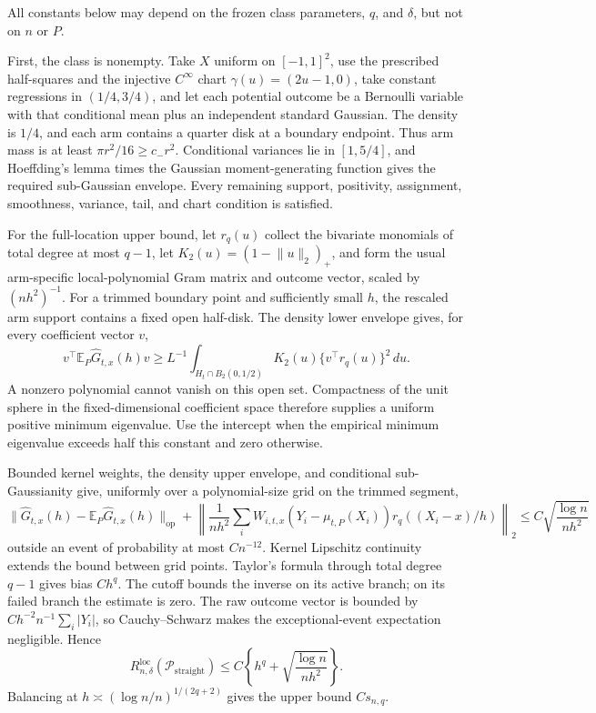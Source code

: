 All constants below may depend on the frozen class parameters, \(q\), and \(\delta\), but not on \(n\) or \(P\).

First, the class is nonempty.  Take \(X\) uniform on \([-1,1]^2\), use the prescribed half-squares and the injective \(C^\infty\) chart \(\gamma(u)=(2u-1,0)\), take constant regressions in \((1/4,3/4)\), and let each potential outcome be a Bernoulli variable with that conditional mean plus an independent standard Gaussian.  The density is \(1/4\), and each arm contains a quarter disk at a boundary endpoint.  Thus arm mass is at least \(\pi r^2/16\geq c_-r^2\).  Conditional variances lie in \([1,5/4]\), and Hoeffding's lemma times the Gaussian moment-generating function gives the required sub-Gaussian envelope.  Every remaining support, positivity, assignment, smoothness, variance, tail, and chart condition is satisfied.

For the full-location upper bound, let \(r_q(u)\) collect the bivariate monomials of total degree at most \(q-1\), let \(K_2(u)=(1-\lVert u\rVert_2)_+\), and form the usual arm-specific local-polynomial Gram matrix and outcome vector, scaled by \((nh^2)^{-1}\).  For a trimmed boundary point and sufficiently small \(h\), the rescaled arm support contains a fixed open half-disk.  The density lower envelope gives, for every coefficient vector \(v\),
\[
v^\top\mathbb E_P\widehat G_{t,x}(h)v
\geq L^{-1}\int_{H_t\cap B_2(0,1/2)}K_2(u)\{v^\top r_q(u)\}^2\,du.
\]
A nonzero polynomial cannot vanish on this open set.  Compactness of the unit sphere in the fixed-dimensional coefficient space therefore supplies a uniform positive minimum eigenvalue.  Use the intercept when the empirical minimum eigenvalue exceeds half this constant and zero otherwise.

Bounded kernel weights, the density upper envelope, and conditional sub-Gaussianity give, uniformly over a polynomial-size grid on the trimmed segment,
\[
\lVert\widehat G_{t,x}(h)-\mathbb E_P\widehat G_{t,x}(h)\rVert_{\mathrm{op}}
+\left\lVert\frac1{nh^2}\sum_iW_{i,t,x}(Y_i-\mu_{t,P}(X_i))r_q((X_i-x)/h)\right\rVert_2
\leq C\sqrt{\frac{\log n}{nh^2}}
\]
outside an event of probability at most \(Cn^{-12}\).  Kernel Lipschitz continuity extends the bound between grid points.  Taylor's formula through total degree \(q-1\) gives bias \(Ch^q\).  The cutoff bounds the inverse on its active branch; on its failed branch the estimate is zero.  The raw outcome vector is bounded by \(Ch^{-2}n^{-1}\sum_i|Y_i|\), so Cauchy--Schwarz makes the exceptional-event expectation negligible.  Hence
\[
R_{n,\delta}^{\mathrm{loc}}(\mathcal P_{\mathrm{straight}})
\leq C\left\{h^q+\sqrt{\frac{\log n}{nh^2}}\right\}.
\]
Balancing at \(h\asymp(\log n/n)^{1/(2q+2)}\) gives the upper bound \(Cs_{n,q}\).

